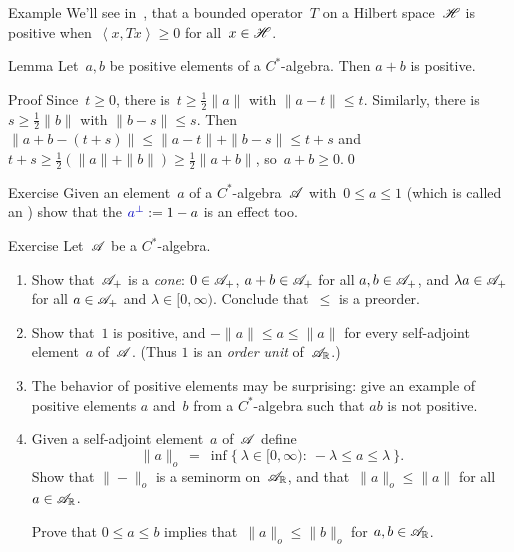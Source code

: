 \documentclass[a]{subfiles}
\begin{document}
\begin{parsec}
\begin{point}{Example}%
We'll see in~,
that a bounded operator~$T$ on a Hilbert space~$\mathscr{H}$
is positive when~$\left<x,Tx\right>\geq 0$ for all~$x\in\mathscr{H}$.
\end{point}
\begin{point}{Lemma}%
Let~$a,b$ be positive elements of a $C^*$-algebra.
Then $a+b$ is positive.
\begin{point}{Proof}
Since~$t\geq 0$,
there is~$t\geq \frac{1}{2}\|a\|$ with $\|a-t\|\leq t$.
Similarly, there is~$s\geq \frac{1}{2}\|b\|$
with $\|b-s\|\leq s$.
Then $\|a+b-(t+s)\|\leq \|a-t\|+\|b-s\|\leq t+s$
and $t+s\geq \frac{1}{2}(\|a\|+\|b\|) \geq \frac{1}{2}\|a+b\|$,
so~$a+b\geq 0$.\qed
\end{point}
\end{point}
\begin{point}{Exercise}%
Given an element~$a$
of a $C^*$-algebra~$\mathscr{A}$
with~$0\leq a\leq 1$
(which is called an )
show that 
the  $\Define{a^\perp} :=1-a$
is an effect too.
\end{point}
\begin{point}{Exercise}%
Let~$\mathscr{A}$ be a $C^*$-algebra.
\begin{enumerate}
\item
Show that~$\mathscr{A}_{+}$ is a \emph{cone}:
$0\in \mathscr{A}_{+}$,
$a+b\in \mathscr{A}_{+}$ for all $a,b\in\mathscr{A}_{+}$,
and
$\lambda a\in \mathscr{A}_{+}$  
for all $a\in \mathscr{A}_{+}$ and $\lambda\in [0,\infty)$.
Conclude that~$\leq$ is a preorder.
\item
Show that~$1$ is positive, and  $-\|a\|\leq a \leq \|a\|$
for every self-adjoint element~$a$ of~$\mathscr{A}$.
(Thus $1$ is an \emph{order unit} of~$\mathscr{A}_{\mathbb{R}}$.)
\item
The behavior of positive elements may be surprising:
give an example of positive elements $a$ and~$b$
from a $C^*$-algebra
such that $ab$ is not positive.
\item
Given a self-adjoint element~$a$ of~$\mathscr{A}$ define
\begin{equation*}
\|a\|_o \ = \ \inf\{\ \lambda\in[0,\infty)\colon \ 
-\lambda\leq a\leq \lambda\ \}.
\end{equation*}
Show that $\|-\|_o$ is a seminorm on~$\mathscr{A}_{\mathbb{R}}$,
and that~$\|a\|_o\leq \|a\|$
for all~$a\in\mathscr{A}_{\mathbb{R}}$.

Prove that $0\leq a\leq b$ implies that~$\|a\|_o\leq\|b\|_o$
for $a,b\in\mathscr{A}_{\mathbb{R}}$.


\end{enumerate}
\end{point}
\end{parsec}
\end{document}
